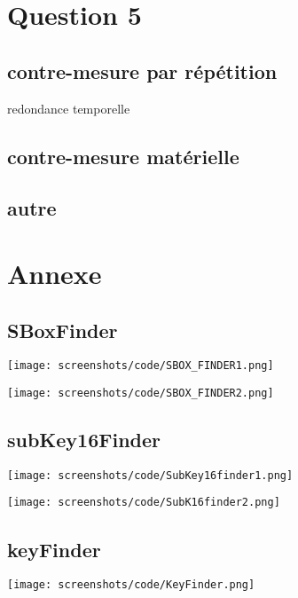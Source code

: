 \documentclass[a4paper,11pt]{article}
\begin{document}
	\section{Question 5}
		\subsection{contre-mesure par répétition}
		redondance temporelle
		\subsection{contre-mesure matérielle}
		\subsection{autre}
	\section{Annexe}
		\subsection{SBoxFinder}
			\begin{center}\texttt{[image: screenshots/code/SBOX\_FINDER1.png]}\end{center} 
			\begin{center}\texttt{[image: screenshots/code/SBOX\_FINDER2.png]}\end{center} 
		\subsection{subKey16Finder}
			\begin{center}\texttt{[image: screenshots/code/SubKey16finder1.png]}\end{center} 
			\begin{center}\texttt{[image: screenshots/code/SubK16finder2.png]}\end{center}
		\subsection{keyFinder}
			\begin{center}\texttt{[image: screenshots/code/KeyFinder.png]}\end{center} 
\end{document}
